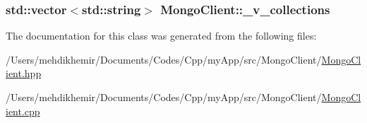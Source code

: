 \subsubsection[{\+\_\+v\+\_\+collections}]{\setlength{\rightskip}{0pt plus 5cm}std\+::vector$<$std\+::string$>$ Mongo\+Client\+::\+\_\+v\+\_\+collections\hspace{0.3cm}{\ttfamily [private]}}\label{class_mongo_client_a0fe1acf7025dfc3ddaea718c5ab03746}


The documentation for this class was generated from the following files\+:\begin{DoxyCompactItemize}
\item 
/\+Users/mehdikhemir/\+Documents/\+Codes/\+Cpp/my\+App/src/\+Mongo\+Client/\hyperlink{_mongo_client_8hpp}{Mongo\+Client.\+hpp}\item 
/\+Users/mehdikhemir/\+Documents/\+Codes/\+Cpp/my\+App/src/\+Mongo\+Client/\hyperlink{_mongo_client_8cpp}{Mongo\+Client.\+cpp}\end{DoxyCompactItemize}

